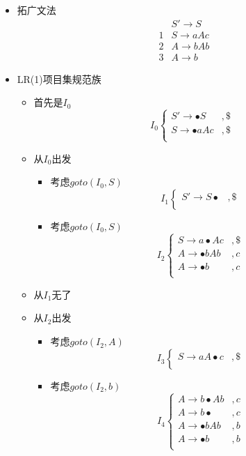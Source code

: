 \documentclass[UTF8]{article}
\newcommand{\blt}{\bullet}
\begin{document}
\begin{itemize}
\item 拓广文法
	$$\begin{array}{ll}
	  & S'\rightarrow S\\
	1 & S\rightarrow aAc\\
	2 & A\rightarrow bAb\\
	3 & A\rightarrow b
	\end{array}$$
\item LR(1)项目集规范族
	\begin{itemize}
	\item 首先是$I_0$
		$$I_0\left\{\begin{array}{ll}
		S'\rightarrow \blt S & ,\$ \\
		S\rightarrow \blt aAc & ,\$ \\
		\end{array}\right.$$
	\item 从$I_0$出发
		\begin{itemize}
		\item 考虑$goto(I_0,S)$
			$$I_1\left\{\begin{array}{ll}
			S'\rightarrow S\blt & ,\$ \\
			\end{array}\right.$$
		\item 考虑$goto(I_0,S)$
			$$I_2\left\{\begin{array}{ll}
			S\rightarrow a\blt Ac & ,\$ \\
			A\rightarrow \blt bAb & ,c\\
			A\rightarrow \blt b & ,c\\
			\end{array}\right.$$
		\end{itemize}
	\item 从$I_1$无了
	\item 从$I_2$出发
		\begin{itemize}
		\item 考虑$goto(I_2,A)$
			$$I_3\left\{\begin{array}{ll}
			S\rightarrow aA\blt c & ,\$ \\
			\end{array}\right.$$
		\item 考虑$goto(I_2,b)$
			$$I_4\left\{\begin{array}{ll}
			A\rightarrow b\blt Ab & ,c\\
			A\rightarrow b\blt & ,c\\
			A\rightarrow \blt bAb & ,b\\
			A\rightarrow \blt b & ,b\\

\end{array}$$
\end{itemize}
\end{itemize}
\end{itemize}
\end{document}
